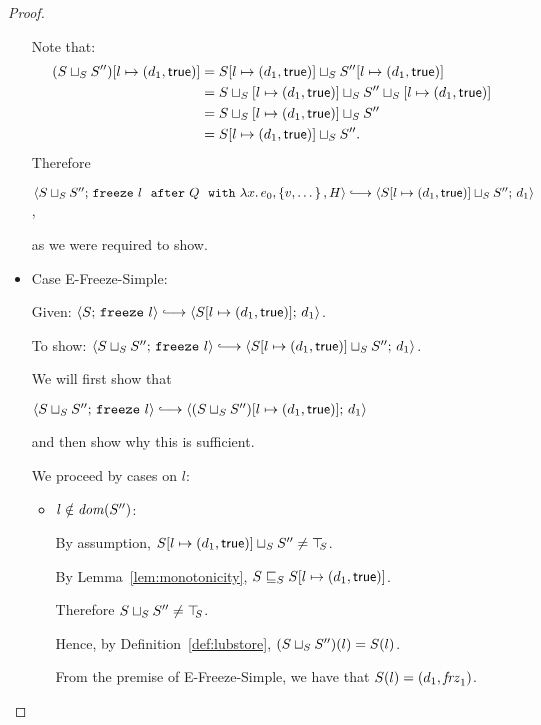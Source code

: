 \begin{proof}
\begin{itemize}
      Note that:
      \begin{align*}
        (S \sqcup_{S} S'')[l \mapsto (d_1, \textsf{true})] &=
        S[l \mapsto (d_1, \textsf{true})] \sqcup_{S} S''[l \mapsto (d_1, \textsf{true})] \\
        &= S \sqcup_{S} \left[ l \mapsto (d_1, \textsf{true}) \right] \sqcup_{S} S'' \sqcup_{S} \left[ l \mapsto (d_1, \textsf{true}) \right] \\
        &= S \sqcup_{S} \left[ l \mapsto (d_1, \textsf{true}) \right] \sqcup_{S} S'' \\
        &= S[l \mapsto (d_1, \textsf{true})] \sqcup_{S} S''.
      \end{align*}
      Therefore

      $\config{\lubstore{S}{S''}}{\freezeafterfull{l}{Q}{\lam{x}{e_0}}{\setof{v,
            \dots}}{H}} \parstepsto
      \config{\lubstore{\extS{S}{l}{d_1}{\frozentrue}}{S''}}{d_1}$,

      as we were required to show.

    \item Case {\sc E-Freeze-Simple}:


      Given: $\config{S}{\freeze{l}} \parstepsto
      \config{\extS{S}{l}{d_1}{\frozentrue}}{d_1}$.

      To show: $\config{\lubstore{S}{S''}}{\freeze{l}}
      \parstepsto
      \config{\lubstore{\extS{S}{l}{d_1}{\frozentrue}}{S''}}{d_1}$.

      We will first show that

      $\config{\lubstore{S}{S''}}{\freeze{l}} \parstepsto
      \config{\extS{(\lubstore{S}{S''})}{l}{d_1}{\frozentrue}}{d_1}$

      and then show why this is sufficient.

      We proceed by cases on $l$:
      \begin{itemize}
      \item $l \notin \mathit{dom}(S'')$:

        By assumption, $S[l \mapsto (d_1, \textsf{true})] \sqcup_{S} S''
        \neq \top\hspace{-0.85mm}_{S}$.

        By Lemma~\ref{lem:monotonicity},
        $S \sqsubseteq_S S[l \mapsto (d_1, \textsf{true})]$.

        Therefore $S \sqcup_{S} S'' \neq \top\hspace{-0.85mm}_{S}$.

        Hence, by Definition~\ref{def:lubstore},
        $(S \sqcup_{S} S'')(l) = S(l)$.

        From the premise of {\sc E-Freeze-Simple}, we have that
        $S(l) = (d_1, \mathit{frz}_1)$.


\end{itemize}
\end{itemize}
\end{proof}
